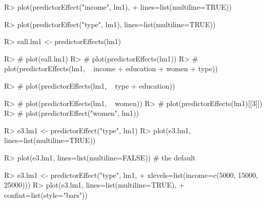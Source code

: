 \documentclass[
]{article}
\begin{document}
\begin{Schunk}
\begin{Sinput}
R> plot(predictorEffect("income", lm1), 
+         lines=list(multiline=TRUE))
\end{Sinput}
\end{Schunk}
\begin{Schunk}
\begin{Sinput}
R> plot(predictorEffect("type", lm1), lines=list(multiline=TRUE))
\end{Sinput}
\end{Schunk}
\begin{Schunk}
\begin{Sinput}
R> eall.lm1 <- predictorEffects(lm1)
\end{Sinput}
\end{Schunk}
\begin{Schunk}
\begin{Sinput}
R> #  plot(eall.lm1)
R> #  plot(predictorEffects(lm1))
R> #  plot(predictorEffects(lm1, ~ income + education + women + type))
\end{Sinput}
\end{Schunk}
\begin{Schunk}
\begin{Sinput}
R> #  plot(predictorEffects(lm1, ~ type + education))
\end{Sinput}
\end{Schunk}
\begin{Schunk}
\begin{Sinput}
R> #  plot(predictorEffects(lm1, ~ women))
R> #  plot(predictorEffects(lm1)[[3]])
R> #  plot(predictorEffect("women", lm1))
\end{Sinput}
\end{Schunk}
\begin{Schunk}
\begin{Sinput}
R> e3.lm1 <- predictorEffect("type", lm1)
R> plot(e3.lm1, lines=list(multiline=TRUE))
\end{Sinput}
\end{Schunk}
\begin{Schunk}
\begin{Sinput}
R> plot(e3.lm1, lines=list(multiline=FALSE)) # the default
\end{Sinput}
\end{Schunk}
\begin{Schunk}
\begin{Sinput}
R> e3.lm1 <- predictorEffect("type", lm1,
+                              xlevels=list(income=c(5000, 15000, 25000)))
R> plot(e3.lm1, lines=list(multiline=TRUE),
+         confint=list(style="bars"))
\end{Sinput}
\end{Schunk}
\end{document}
